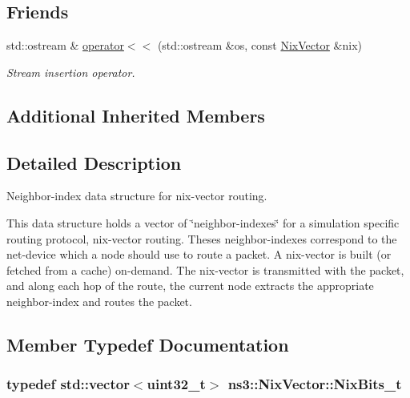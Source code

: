 \subsection*{Friends}
\begin{DoxyCompactItemize}
\item 
std\+::ostream \& \hyperlink{classns3_1_1NixVector_a6ee75a260c3393236069ea82c8af005d}{operator$<$$<$} (std\+::ostream \&os, const \hyperlink{classns3_1_1NixVector}{Nix\+Vector} \&nix)
\begin{DoxyCompactList}\small\item\em Stream insertion operator. \end{DoxyCompactList}\end{DoxyCompactItemize}
\subsection*{Additional Inherited Members}


\subsection{Detailed Description}
Neighbor-\/index data structure for nix-\/vector routing. 

This data structure holds a vector of \char`\"{}neighbor-\/indexes\char`\"{} for a simulation specific routing protocol, nix-\/vector routing. Theses neighbor-\/indexes correspond to the net-\/device which a node should use to route a packet. A nix-\/vector is built (or fetched from a cache) on-\/demand. The nix-\/vector is transmitted with the packet, and along each hop of the route, the current node extracts the appropriate neighbor-\/index and routes the packet. 

\subsection{Member Typedef Documentation}
\subsubsection[{\texorpdfstring{Nix\+Bits\+\_\+t}{NixBits_t}}]{\setlength{\rightskip}{0pt plus 5cm}typedef std\+::vector$<$uint32\+\_\+t$>$ {\bf ns3\+::\+Nix\+Vector\+::\+Nix\+Bits\+\_\+t}\hspace{0.3cm}{\ttfamily [private]}}\hypertarget{classns3_1_1NixVector_a85f2af19f55707f2bca25549ef1c3539}{}\label{classns3_1_1NixVector_a85f2af19f55707f2bca25549ef1c3539}



